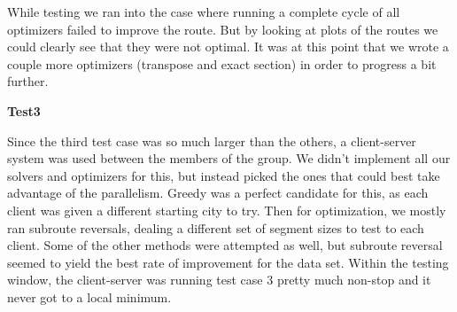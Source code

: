 \documentclass[letterpaper,10pt,titlepage,fleqn]{article}
\begin{document}
While testing we ran into the case where running a complete cycle of all optimizers failed to improve the route. But by looking at plots of the routes we could clearly see that they were not optimal. It was at this point that we wrote a couple more optimizers (transpose and exact section) in order to progress a bit further.

\textbf{Test3}

Since the third test case was so much larger than the others, a client-server system was used between the members of the group. We didn’t implement all our solvers and optimizers for this, but instead picked the ones that could best take advantage of the parallelism. Greedy was a perfect candidate for this, as each client was given a different starting city to try. Then for optimization, we mostly ran subroute reversals, dealing a different set of segment sizes to test to each client. Some of the other methods were attempted as well, but subroute reversal seemed to yield the best rate of improvement for the data set. Within the testing window, the client-server was running test case 3 pretty much non-stop and it never got to a local minimum. \\
\end{document}
